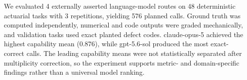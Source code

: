 We evaluated 4 externally asserted language-model routes on 48 deterministic actuarial tasks with 3 repetitions, yielding 576 planned calls. Ground truth was computed independently, numerical and code outputs were graded mechanically, and validation tasks used exact planted defect codes. claude-opus-5 achieved the highest capability mean (0.876), while gpt-5.6-sol produced the most exact-correct calls. The leading capability means were not statistically separated after multiplicity correction, so the experiment supports metric- and domain-specific findings rather than a universal model ranking.
